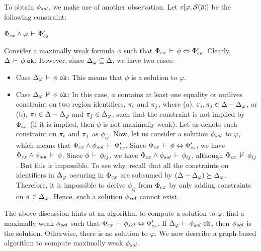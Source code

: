 To obtain $\phi_{sol}$, we make use of another observation. Let $c\lbrack
\varphi, \mathcal{S}(\overline{\rho}) \rbrack$ be the following constraint:
\begin{center}
\(
  \Phi_{cx} \wedge \varphi\,\vdash\,\Phi_{cs}'
\)
\end{center}
Consider a maximally weak formula $\phi$ such that
$\Phi_{cx}\,\vdash\,\phi \Leftrightarrow \Phi_{cs}'$. 
Clearly, $\Delta\,\vdash\,\phi \; \texttt{ok}$. However, since $\Delta_{\varphi}
\subseteq \Delta$, we have two cases:
\begin{itemize}

\item Case $\Delta_{\varphi}\,\vdash\,\phi \; \texttt{ok}$: This means that $\phi$ is
a solution to $\varphi$. 

\item Case $\Delta_{\varphi}\,\nvdash\,\phi \; \texttt{ok}$: In this case, $\phi$
contains at least one equality or outlives constraint on two region
identifiers, $\pi_i$ and $\pi_j$, where (a). $\pi_i,\pi_j \in
\Delta - \Delta_{\varphi}$, or (b). $\pi_i \in \Delta -
\Delta_{\varphi}$ and $\pi_j \in \Delta_{\varphi}$, such that the
constraint is not implied by $\Phi_{cx}$ (if it is implied, then $\phi$
is not maximally weak). Let us denote such constraint on $\pi_i$ and
$\pi_j$ as $\phi_{ij}$. Now, let us consider a solution $\phi_{sol}$ to
$\varphi$, which means that $\Phi_{cx} \wedge \phi_{sol}\,\vdash\,\Phi_{cs}'$.
Since $\Phi_{cx}\,\vdash\,\phi \Leftrightarrow \Phi_{cs}'$, we have
$\Phi_{cx} \wedge \phi_{sol}\,\vdash\,\phi$. Since
$\phi\,\vdash\,\phi_{ij}$, we have $\Phi_{cx} \wedge
\phi_{sol}\,\vdash\,\phi_{ij}$, although $\Phi_{cx}\,\nvdash\,\phi_{ij}$. But
this is impossible. To see why, recall that all the constraints on
identifiers in $\Delta_{\varphi}$ occuring in $\Phi_{cx}$ are subsumed
by $(\Delta - \Delta_{\varphi}) \succeq \Delta_{\varphi}$.
Therefore, it is impossible to derive $\phi_{ij}$ from $\Phi_{cx}$ by
only adding constraints on $\pi \in \Delta_{\varphi}$. Hence, such a
solution $\phi_{sol}$ cannot exist.
\end{itemize}
The above discussion hints at an algorithm to compute a solution to
$\varphi$: find a maximally weak $\phi_{sol}$ such that $\Phi_{cx}\,\vdash\,\phi_{sol} \Leftrightarrow \Phi_{cs}'$. If $\Delta_{\varphi}\,\vdash\,\phi_{sol} \; \texttt{ok}$, then $\phi_{sol}$ is the solution. Otherwise, there is no
solution to $\varphi$. We now describe a graph-based algorithm to
compute maximally weak $\phi_{sol}$.

